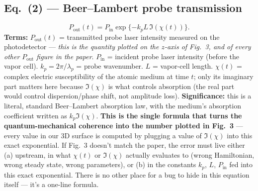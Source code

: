 \documentclass[11pt]{article}
\begin{document}
\subsection*{Eq.~(2) --- Beer--Lambert probe transmission}
\begin{equation}
P_\text{out}(t) = P_\text{in}\exp\{-k_pL\,\Im(\chi(t))\}. \tag{2}
\end{equation}
\textbf{Terms:} $P_\text{out}(t)$ = transmitted probe laser intensity
measured on the photodetector --- \emph{this is the quantity plotted on
the $z$-axis of Fig.~3, and of every other $P_\text{out}$ figure in the
paper}. $P_\text{in}$ = incident probe laser intensity (before the vapor
cell). $k_p=2\pi/\lambda_p$ = probe wavenumber. $L$ = vapor-cell length.
$\chi(t)$ = complex electric susceptibility of the atomic medium at time
$t$; only its imaginary part matters here because $\Im(\chi)$ is what
controls absorption (the real part would control dispersion/phase
shift, not amplitude loss).
\textbf{Significance:} this is a literal, standard Beer--Lambert
absorption law, with the medium's absorption coefficient written as
$k_p\Im(\chi)$. \textbf{This is the single formula that turns the
quantum-mechanical coherence into the number plotted in Fig.~3} ---
every value in our 3D surface is computed by plugging a value of
$\Im(\chi)$ into this exact exponential. If Fig.~3 doesn't match the
paper, the error must live either (a) upstream, in what $\chi(t)$ or
$\Im(\chi)$ actually evaluates to (wrong Hamiltonian, wrong steady
state, wrong parameters), or (b) in the constants $k_p$, $L$, $P_\text{in}$
fed into this exact exponential. There is no other place for a bug to
hide in this equation itself --- it's a one-line formula.
\end{document}

